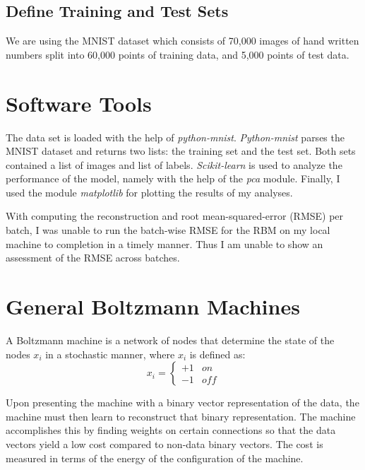 \documentclass[11pt]{amsart}
\theoremstyle{remark}
\theoremstyle{remark}
\numberwithin{equation}{section}
\begin{document}
  \subsection{Define Training and Test Sets}
    We are using the MNIST dataset which consists of 70,000 images of
    hand written numbers split into 60,000 points of training data,
    and 5,000 points of test data. 

\section{Software Tools}
	 The data set is loaded with the help of \textit{python-mnist}.
    \textit{Python-mnist} parses the MNIST dataset and returns two lists: the training set 
    and the test set. Both sets contained a list of images and list of labels. \textit{Scikit-learn}
    is used to analyze the performance of the model, namely with the help of the 
     \textit{pca} module. Finally, I used the module \textit{matplotlib} for 
     plotting the results of my analyses. 

    With computing the reconstruction and root mean-squared-error (RMSE) per batch,
    I was unable to run the batch-wise RMSE for the RBM on my local machine to 
    completion in a timely manner. Thus I am unable to show an assessment of the 
    RMSE across batches. 
  
\section{General Boltzmann Machines}
    A Boltzmann machine is a network of nodes that determine the state of the 
    nodes $x_i$ in a stochastic manner, where $x_i$ is defined as:
    \[ 
	x_i =     
    \begin{cases}
    {+1} & on\\
    {-1} & off
    	\end{cases}
    \]
    
    Upon presenting the machine with a binary vector
    representation of the data, the machine must then learn to reconstruct that 
    binary representation.  The machine accomplishes this by finding weights on
    certain connections so that the data vectors yield a low cost compared to 
    non-data binary vectors. The cost is measured in terms of the energy of the 
    configuration of the machine.
    
\end{document}
